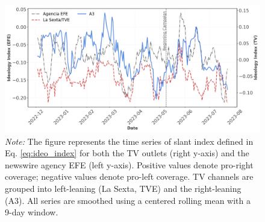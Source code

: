 \documentclass[12pt]{article}
\begin{document}
	
	
	
	\begin{figure}[!htb]
		\caption{Evolution of the Slant Index}
		\centering
		\includegraphics[width=150mm]{figures/tv_vs_efe_net_diff}
		\caption*{\small \textit{Note:} The figure represents the time series of slant index defined in Eq. \eqref{eq:ideo_index} for both the  TV outlets (right y-axis) and the newswire agency EFE (left y-axis). Positive values denote pro-right coverage; negative values denote pro-left coverage. TV channels are grouped into left-leaning (La Sexta, TVE) and the right-leaning (A3). All series are smoothed using a centered rolling mean with a 9-day window.}
		\label{fig:net_tone}
	\end{figure}
	
	
\end{document}

